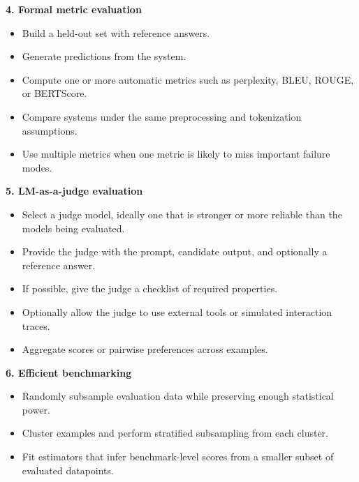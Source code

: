 \documentclass[11pt]{article}
\begin{document}
\textbf{4. Formal metric evaluation}
\begin{itemize}
    \item Build a held-out set with reference answers.
    \item Generate predictions from the system.
    \item Compute one or more automatic metrics such as perplexity, BLEU, ROUGE, or BERTScore.
    \item Compare systems under the same preprocessing and tokenization assumptions.
    \item Use multiple metrics when one metric is likely to miss important failure modes.
\end{itemize}

\textbf{5. LM-as-a-judge evaluation}
\begin{itemize}
    \item Select a judge model, ideally one that is stronger or more reliable than the models being evaluated.
    \item Provide the judge with the prompt, candidate output, and optionally a reference answer.
    \item If possible, give the judge a checklist of required properties.
    \item Optionally allow the judge to use external tools or simulated interaction traces.
    \item Aggregate scores or pairwise preferences across examples.
\end{itemize}

\textbf{6. Efficient benchmarking}
\begin{itemize}
    \item Randomly subsample evaluation data while preserving enough statistical power.
    \item Cluster examples and perform stratified subsampling from each cluster.
    \item Fit estimators that infer benchmark-level scores from a smaller subset of evaluated datapoints.
\end{itemize}
\end{document}
